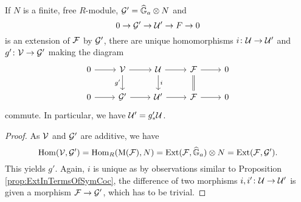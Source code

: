 \documentclass[../main.tex]{subfiles}
\begin{document}
\begin{prop}
  If $N$ is a finite, free $R$-module, $\mathcal{G}' = \widehat{\mathbb{G}}_a \otimes N$ and 
  \begin{equation*}
    0 \to \mathcal{G}' \to \mathcal{U}' \to F \to 0
  \end{equation*}
  is an extension of $\mathcal{F}$ by $\mathcal{G}'$, there are unique homomorphisms
    $i\colon  \mathcal{U} \to \mathcal{U}'$ and $g'\colon  \mathcal{V} \to \mathcal{G}'$ making the diagram
  \begin{equation*}
\begin{tikzcd}[ampersand replacement=\&]
	0 \& {\cV} \& \cU \& \cF \& 0 \\
	0 \& {\cG'} \& {\cU'} \& \cF \& 0
	\arrow[from=1-1, to=1-2]
	\arrow[from=1-2, to=1-3]
	\arrow["{g'}"', from=1-2, to=2-2]
	\arrow[from=1-3, to=1-4]
	\arrow["i", from=1-3, to=2-3]
	\arrow[from=1-4, to=1-5]
	\arrow[Rightarrow, no head, from=1-4, to=2-4]
	\arrow[from=2-1, to=2-2]
	\arrow[from=2-2, to=2-3]
	\arrow[from=2-3, to=2-4]
	\arrow[from=2-4, to=2-5]
\end{tikzcd}
  \end{equation*}
  commute. In particular, we have $\mathcal{U}' = g'_* \mathcal{U}$. 
\begin{proof}
  As $\mathcal{V}$ and $\mathcal{G}'$ are additive, we have
  \begin{equation*}
    \operatorname{Hom}(\mathcal{V}, \mathcal{G}') = \operatorname{Hom}_R(\mathrm M(\mathcal{F}), N) = \operatorname{Ext}(\mathcal{F}, \widehat{\mathbb{G}}_a) \otimes N =
    \operatorname{Ext}(\mathcal{F}, \mathcal{G}').
  \end{equation*}
  This yields $g'$. Again, $i$ is unique as by observations similar to 
  Proposition \ref{prop:ExtInTermsOfSymCoc}, the difference of two
  morphisms $i,i'\colon \mathcal{U} \to \mathcal{U}'$ is given a morphism $\mathcal{F} \to \mathcal{G}'$, which has
  to be trivial.
\end{proof}
\end{prop}
\end{document}
